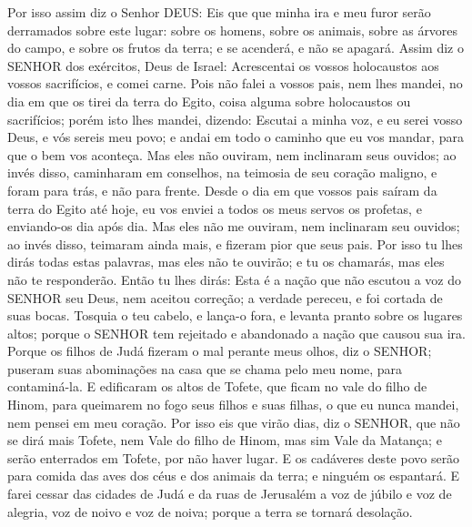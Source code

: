 {Por isso assim diz o Senhor DEUS: Eis que que minha ira e meu furor serão derramados sobre este lugar: sobre os homens, sobre os animais, sobre as árvores do campo, e sobre os frutos da terra; e se acenderá, e não se apagará.
Assim diz o SENHOR dos exércitos, Deus de Israel: Acrescentai os vossos holocaustos aos vossos sacrifícios, e comei carne.
Pois não falei a vossos pais, nem lhes mandei, no dia em que os tirei da terra do Egito, coisa alguma sobre holocaustos ou sacrifícios;
porém isto lhes mandei, dizendo: Escutai a minha voz, e eu serei vosso Deus, e vós sereis meu povo; e andai em todo o caminho que eu vos mandar, para que o bem vos aconteça.
Mas eles não ouviram, nem inclinaram seus ouvidos; ao invés disso, caminharam em
{} conselhos, na teimosia de seu coração maligno, e foram para trás, e não para frente.
Desde o dia em que vossos pais saíram da terra do Egito até hoje, eu vos enviei a todos os meus servos os profetas, e enviando-os dia após dia.
Mas eles não me ouviram, nem inclinaram seu ouvidos; ao invés disso, teimaram ainda mais,
 e fizeram pior que seus pais.
Por isso tu lhes dirás todas estas palavras, mas eles não te ouvirão; e tu os chamarás, mas eles não te responderão.
Então tu lhes dirás: Esta é a nação que não escutou a voz do SENHOR seu Deus, nem aceitou correção; a verdade
 pereceu, e foi cortada de suas bocas.
Tosquia o teu cabelo, e lança-o fora, e levanta pranto sobre os lugares altos; porque o SENHOR tem rejeitado e abandonado a nação que causou sua ira.
Porque os filhos de Judá fizeram o mal perante meus olhos, diz o SENHOR; puseram suas abominações na casa que se chama pelo meu nome, para contaminá-la.
E edificaram os altos de Tofete, que ficam no vale do filho de Hinom, para queimarem no fogo seus filhos e suas filhas, o que eu nunca mandei, nem pensei em meu coração.
Por isso eis que virão dias, diz o SENHOR, que não se dirá mais Tofete, nem Vale do filho de Hinom, mas sim Vale da Matança; e serão enterrados em Tofete, por não haver lugar.
E os cadáveres deste povo serão para comida das aves dos céus e dos animais da terra; e ninguém os espantará.
E farei cessar das cidades de Judá e da ruas de Jerusalém a voz de júbilo e voz de alegria, voz de noivo e voz de noiva; porque a terra se tornará desolação.

\par }

